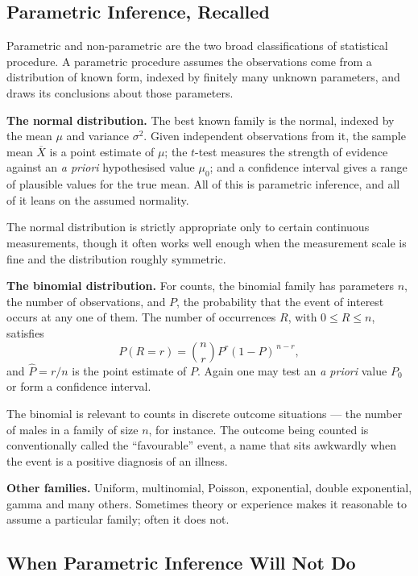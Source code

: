 \documentclass[11pt,a4paper]{article}
\theoremstyle{definition}
\begin{document}
\subsection{Parametric Inference, Recalled}

Parametric and non-parametric are the two broad classifications of statistical
procedure. A parametric procedure assumes the observations come from a distribution
of known form, indexed by finitely many unknown parameters, and draws its
conclusions about those parameters.

\textbf{The normal distribution.} The best known family is the normal, indexed by
the mean $\mu$ and variance $\sigma^{2}$. Given independent observations from it,
the sample mean $\overline{X}$ is a point estimate of $\mu$; the $t$-test measures
the strength of evidence against an \emph{a priori} hypothesised value $\mu_0$; and
a confidence interval gives a range of plausible values for the true mean. All of
this is parametric inference, and all of it leans on the assumed normality.

The normal distribution is strictly appropriate only to certain continuous
measurements, though it often works well enough when the measurement scale is fine
and the distribution roughly symmetric.

\textbf{The binomial distribution.} For counts, the binomial family has parameters
$n$, the number of observations, and $P$, the probability that the event of
interest occurs at any one of them. The number of occurrences $R$, with
$0 \leq R \leq n$, satisfies
$$P(R = r) = \binom{n}{r}P^{r}(1-P)^{\,n-r},$$
and $\widehat{P} = r/n$ is the point estimate of $P$. Again one may test an
\emph{a priori} value $P_0$ or form a confidence interval.

The binomial is relevant to counts in discrete outcome situations --- the number of
males in a family of size $n$, for instance. The outcome being counted is
conventionally called the ``favourable'' event, a name that sits awkwardly when the
event is a positive diagnosis of an illness.

\textbf{Other families.} Uniform, multinomial, Poisson, exponential, double
exponential, gamma and many others. Sometimes theory or experience makes it
reasonable to assume a particular family; often it does not.

\subsection{When Parametric Inference Will Not Do}
\end{document}
